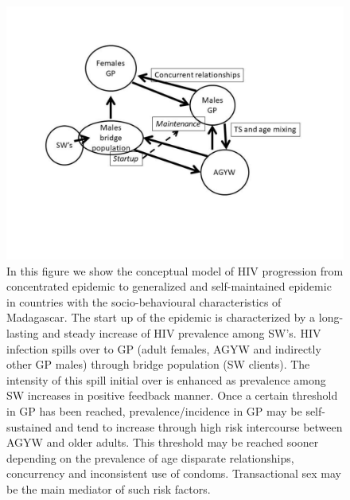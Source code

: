 \documentclass[preprint,12pt]{elsarticle}
\begin{document}
\begin{figure}
\centering\includegraphics[width=1.0\linewidth,angle=0]{Figure_discussion.pdf}
\caption{In this figure we show the conceptual model of HIV progression from concentrated epidemic to generalized and self-maintained epidemic in countries with the socio-behavioural characteristics of Madagascar. The start up of the epidemic is characterized by a long-lasting and steady increase of HIV prevalence among SW’s. HIV infection spills over to GP (adult females, AGYW and indirectly other GP males) through bridge population (SW clients). The intensity of this spill initial over is enhanced as prevalence among SW increases in positive feedback manner. Once a certain threshold in GP has been reached, prevalence/incidence in GP may be self-sustained and tend to increase through high risk intercourse between AGYW and older adults. This threshold may be reached sooner depending on the prevalence of age disparate relationships, concurrency and inconsistent use of condoms. Transactional sex may be the main mediator of such risk factors.}
\label{Fig2:Discussion}
\end{figure}
\end{document}
